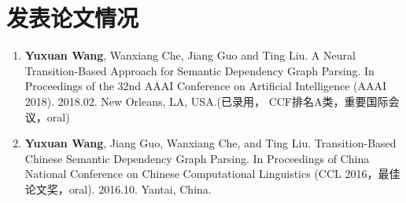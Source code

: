 \section{发表论文情况}
\begin{enumerate}
	\item \textbf{Yuxuan Wang}, Wanxiang Che, Jiang Guo and Ting Liu. A Neural Transition-Based Approach for Semantic Dependency Graph Parsing. In Proceedings of the 32nd AAAI Conference on Artificial Intelligence (AAAI 2018). 2018.02. New Orleans, LA, USA.(已录用， CCF排名A类，重要国际会议，oral)
	\item \textbf{Yuxuan Wang}, Jiang Guo,  Wanxiang Che, and Ting Liu. Transition-Based Chinese Semantic Dependency Graph Parsing. In Proceedings of China National Conference on Chinese Computational Linguistics (CCL 2016，最佳论文奖，oral). 2016.10. Yantai, China.
\end{enumerate}

\clearpage

\newpage